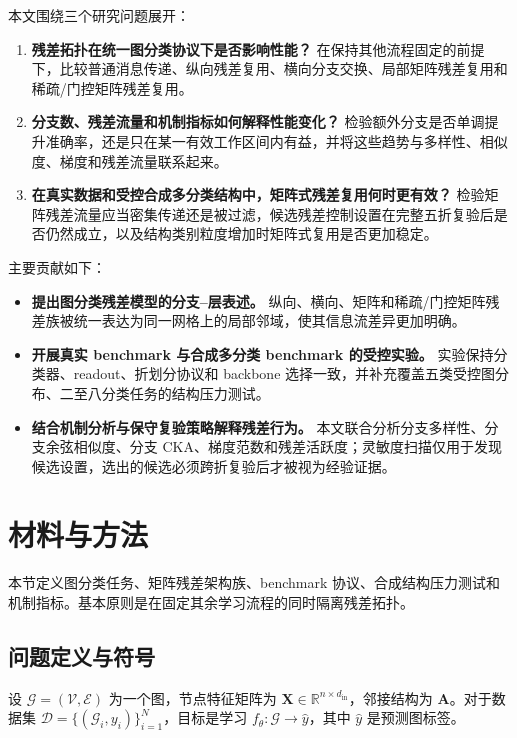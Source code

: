 \documentclass[UTF8,10pt]{ctexart}
\begin{document}
本文围绕三个研究问题展开：
\begin{enumerate}
    \item \textbf{残差拓扑在统一图分类协议下是否影响性能？} 在保持其他流程固定的前提下，比较普通消息传递、纵向残差复用、横向分支交换、局部矩阵残差复用和稀疏/门控矩阵残差复用。
    \item \textbf{分支数、残差流量和机制指标如何解释性能变化？} 检验额外分支是否单调提升准确率，还是只在某一有效工作区间内有益，并将这些趋势与多样性、相似度、梯度和残差流量联系起来。
    \item \textbf{在真实数据和受控合成多分类结构中，矩阵式残差复用何时更有效？} 检验矩阵残差流量应当密集传递还是被过滤，候选残差控制设置在完整五折复验后是否仍然成立，以及结构类别粒度增加时矩阵式复用是否更加稳定。
\end{enumerate}

主要贡献如下：
\begin{itemize}
    \item \textbf{提出图分类残差模型的分支--层表述。} 纵向、横向、矩阵和稀疏/门控矩阵残差族被统一表达为同一网格上的局部邻域，使其信息流差异更加明确。
    \item \textbf{开展真实 benchmark 与合成多分类 benchmark 的受控实验。} 实验保持分类器、readout、折划分协议和 backbone 选择一致，并补充覆盖五类受控图分布、二至八分类任务的结构压力测试。
    \item \textbf{结合机制分析与保守复验策略解释残差行为。} 本文联合分析分支多样性、分支余弦相似度、分支 CKA、梯度范数和残差活跃度；灵敏度扫描仅用于发现候选设置，选出的候选必须跨折复验后才被视为经验证据。
\end{itemize}

\section{材料与方法}
\label{sec:methods}

本节定义图分类任务、矩阵残差架构族、benchmark 协议、合成结构压力测试和机制指标。基本原则是在固定其余学习流程的同时隔离残差拓扑。

\subsection{问题定义与符号}

设 \(\mathcal{G}=(\mathcal{V},\mathcal{E})\) 为一个图，节点特征矩阵为 \(\mathbf{X}\in\mathbb{R}^{n\times d_{\mathrm{in}}}\)，邻接结构为 \(\mathbf{A}\)。对于数据集 \(\mathcal{D}=\{(\mathcal{G}_i,y_i)\}_{i=1}^{N}\)，目标是学习 \(f_{\theta}:\mathcal{G}\rightarrow \hat{y}\)，其中 \(\hat{y}\) 是预测图标签。
\end{document}
